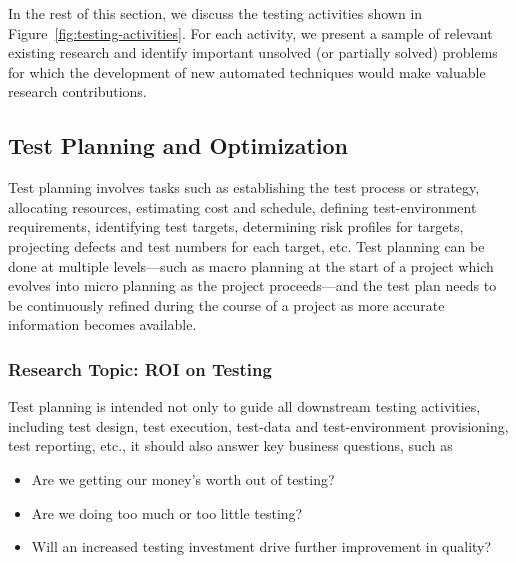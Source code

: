 In the rest of this section, we discuss the testing activities shown in
Figure~\ref{fig:testing-activities}. For each activity, we present a sample of
relevant existing research and identify important unsolved (or partially solved)
problems for which the development of new automated techniques would make
valuable research contributions.

\subsection{Test Planning and Optimization}
\label{sec:test-planning}

Test planning involves tasks such as establishing the test process or strategy,
allocating resources, estimating cost and schedule, defining test-environment
requirements, identifying test targets, determining risk profiles for targets,
projecting defects and test numbers for each target, etc.  Test planning can be
done at multiple levels---such as macro planning at the start of a project which
evolves into micro planning as the project proceeds---and the test plan needs to
be continuously refined during the course of a project as more accurate
information becomes available.

\subsubsection*{Research Topic: ROI on Testing}

Test planning is intended not only to guide all downstream testing activities,
including test design, test execution, test-data and test-environment
provisioning, test reporting, etc., it should also answer key business
questions, such as~\cite{Kagan:NextGenTesting}

\begin{itemize}
\denseitems


\item Are we getting our money's worth out of testing?

\item Are we doing too much or too little testing?

\item Will an increased testing investment drive further improvement in quality?


\end{itemize}

